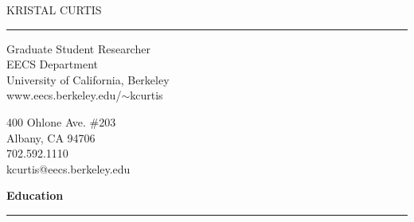 \documentclass[11pt]{article}
\title{}
\author{}
\date{}
\newcommand{\head}[1]{
{\bf #1} \\
\rule{\textwidth}{0.01 in}

\vspace{-0.35 in}

}
\begin{document}

% 




\begin{center}{\Huge KRISTAL CURTIS} \end{center}
\rule{\textwidth}{0.01 in}

\begin{minipage}{0.5 \textwidth}
\begin{flushleft}
Graduate Student Researcher \\
EECS Department\\
University of California, Berkeley \\
www.eecs.berkeley.edu/$\sim$kcurtis
\ 
\end{flushleft}
\end{minipage}
\begin{minipage}{0.5 \textwidth}
\begin{flushright}
400 Ohlone Ave. \#203 \\
Albany, CA 94706 \\
702.592.1110\\
kcurtis@eecs.berkeley.edu\\
\end{flushright}
\end{minipage}
\vspace{0.25 in}


\head{Education}
\end{document}
